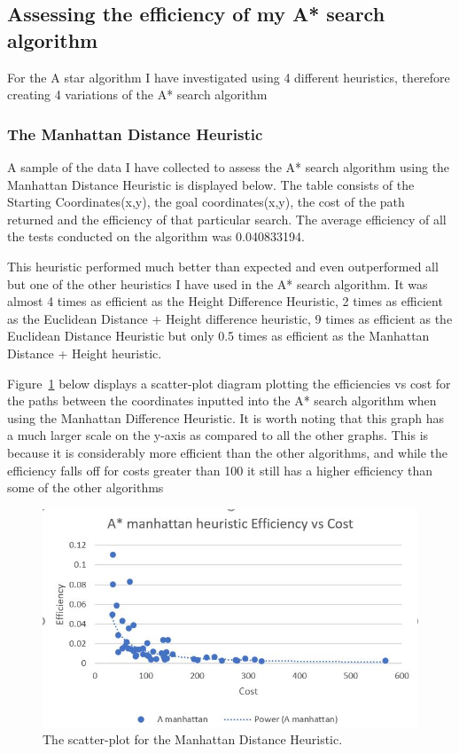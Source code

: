 \documentclass[11pt,oneside]{article}
\begin{document}
\subsection{Assessing the efficiency of my A* search algorithm}
For the A star algorithm I have investigated using 4 different heuristics, therefore creating 4 variations of the A* search algorithm

\subsubsection{The Manhattan Distance Heuristic}
    A sample of the data I have collected to assess the A* search algorithm using the Manhattan Distance Heuristic is displayed below. The table consists of the Starting Coordinates(x,y), the goal coordinates(x,y), the cost of the path returned and the efficiency of that particular search. The average efficiency of all the tests conducted on the algorithm was 0.040833194.
    
    This heuristic performed much better than expected and even outperformed all but one of the other heuristics I have used in the A* search algorithm. It was almost 4 times as efficient as the Height Difference Heuristic, 2 times as efficient as the Euclidean Distance + Height difference heuristic, 9 times as efficient as the Euclidean Distance Heuristic but only 0.5 times as efficient as the Manhattan Distance + Height heuristic.
    
    Figure~\ref{fig:MDEvC} below displays a scatter-plot diagram plotting the efficiencies vs cost for the paths between the coordinates inputted into the A* search algorithm when using the Manhattan Difference Heuristic. It is worth noting that this graph has a much larger scale on the y-axis as compared to all the other graphs. This is because it is considerably more efficient than the other algorithms, and while the efficiency falls off for costs greater than 100 it still has a higher efficiency than some of the other algorithms

    \begin{figure}[H]
    \centering
      \includegraphics[scale=0.8]{MD efficiency vs cost.JPG}
      \caption{The scatter-plot for the Manhattan Distance Heuristic.}
      \label{fig:MDEvC}
    \end{figure} 
    
\end{document}
